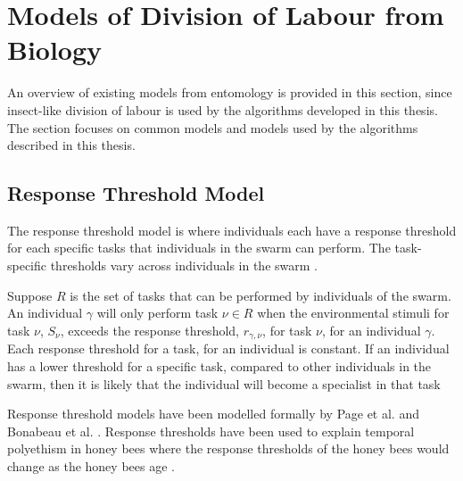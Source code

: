 
\section{Models of Division of Labour from Biology}

An overview of existing models from entomology is provided in this section, since insect-like division of labour is used by the algorithms developed in this thesis. The section focuses on common models and models used by the algorithms described in this thesis.

\subsection{Response Threshold Model}
\label{responsethresholdmodel}

The response threshold model is where individuals each have a response threshold for each specific tasks that individuals in the swarm can perform.  The task-specific thresholds vary across individuals in the swarm \cite{robinson1989genetic}.

Suppose $R$ is the set of tasks that can be performed by individuals of the swarm. An individual $\gamma$ will only perform task $\nu \in R$ when the environmental stimuli for task $\nu$, $S_\nu$, exceeds the response threshold, $r_{\gamma,\nu}$, for task $\nu$, for an individual $\gamma$. Each response threshold for a task, for an individual is constant. If an individual has a lower threshold for a specific task, compared to other individuals in the swarm, then it is likely that the individual will become a specialist in that task \cite{robinson1989genetic}

Response threshold models have been modelled formally by Page et al. \cite{page1990self} and Bonabeau et al. \cite{bonabeau1999role}. Response thresholds have been used to explain temporal polyethism in honey bees where the response thresholds of the honey bees would change as the honey bees age \cite{robinson1987regulation}.


